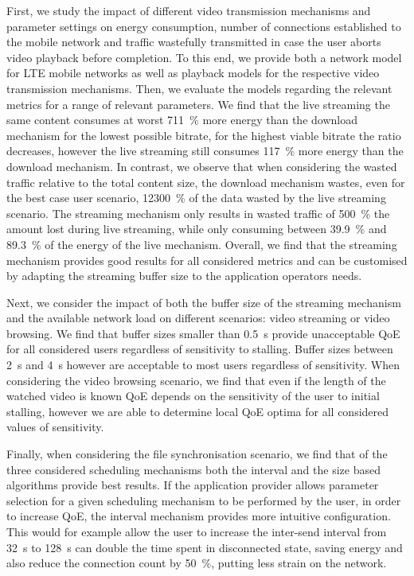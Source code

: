 First, we study the impact of different video transmission mechanisms and parameter settings on energy consumption, number of connections established to the mobile network and traffic wastefully transmitted in case the user aborts video playback before completion.
To this end, we provide both a network model for \gls{LTE} mobile networks as well as playback models for the respective video transmission mechanisms.
Then, we evaluate the models regarding the relevant metrics for a range of relevant parameters.
We find that the live streaming the same content consumes at worst \SI{711}{\percent} more energy than the download mechanism for the lowest possible bitrate, for the highest viable bitrate the ratio decreases, however the live streaming still consumes \SI{117}{\percent} more energy than the download mechanism.
In contrast, we observe that when considering the wasted traffic relative to the total content size, the download mechanism wastes, even for the best case user scenario, \SI{12300}{\percent} of the data wasted by the live streaming scenario.
The streaming mechanism only results in wasted traffic of \SI{500}{\percent} the amount lost during live streaming, while only consuming between \SI{39.9}{\percent} and \SI{89.3}{\percent} of the energy of the live mechanism.	
Overall, we find that the streaming mechanism provides good results for all considered metrics and can be customised by adapting the streaming buffer size to the application operators needs. 

Next, we consider the impact of both the buffer size of the streaming mechanism and the available network load on different scenarios: video streaming or video browsing.
We find that buffer sizes smaller than \SI{0.5}{\second} provide unacceptable \gls{QoE} for all considered users regardless of sensitivity to stalling.
Buffer sizes between \SI{2}{\second} and \SI{4}{\second} however are acceptable to most users regardless of sensitivity.
When considering the video browsing scenario, we find that even if the length of the watched video is known \gls{QoE} depends on the sensitivity of the user to initial stalling, however we are able to determine local \gls{QoE} optima for all considered values of sensitivity.

Finally, when considering the file synchronisation scenario, we find that of the three considered scheduling mechanisms both the interval and the size based algorithms provide best results.
If the application provider allows parameter selection for a given scheduling mechanism to be performed by the user, in order to increase \gls{QoE}, the interval mechanism provides more intuitive configuration.
This would for example allow the user to increase the inter-send interval from \SI{32}{\second} to \SI{128}{\second} can double the time spent in disconnected state, saving energy and also reduce the connection count by \SI{50}{\percent}, putting less strain on the network.

